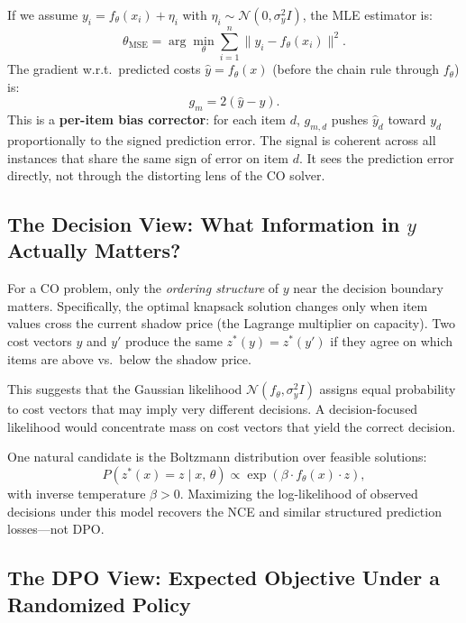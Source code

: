 \documentclass[11pt]{article}
\begin{document}
If we assume $y_i = f_\theta(x_i) + \eta_i$ with $\eta_i \sim \mathcal{N}(0,
\sigma_y^2 I)$, the MLE estimator is:
\begin{equation}
  \theta_{\mathrm{MSE}} = \arg\min_\theta \sum_{i=1}^n
    \|y_i - f_\theta(x_i)\|^2.
  \label{eq:mse}
\end{equation}
The gradient w.r.t.\ predicted costs $\hat{y} = f_\theta(x)$ (before the chain
rule through $f_\theta$) is:
\begin{equation}
  g_m = 2(\hat{y} - y).
  \label{eq:gm}
\end{equation}
This is a \textbf{per-item bias corrector}: for each item $d$, $g_{m,d}$ pushes
$\hat{y}_d$ toward $y_d$ proportionally to the signed prediction error.  The
signal is coherent across all instances that share the same sign of error on
item $d$.  It sees the prediction error directly, not through the distorting
lens of the CO solver.

\subsection{The Decision View: What Information in $y$ Actually Matters?}

For a CO problem, only the \emph{ordering structure} of $y$ near the decision
boundary matters.  Specifically, the optimal knapsack solution changes only when
item values cross the current shadow price (the Lagrange multiplier on capacity).
Two cost vectors $y$ and $y'$ produce the same $z^*(y) = z^*(y')$ if they agree
on which items are above vs.\ below the shadow price.

This suggests that the Gaussian likelihood $\mathcal{N}(f_\theta, \sigma_y^2 I)$
assigns equal probability to cost vectors that may imply very different decisions.
A decision-focused likelihood would concentrate mass on cost vectors that yield
the correct decision.

One natural candidate is the Boltzmann distribution over feasible solutions:
\begin{equation}
  P(z^*(x) = z \mid x,\, \theta) \propto \exp\!\left(\beta \cdot
    f_\theta(x) \cdot z\right),
  \label{eq:boltzmann}
\end{equation}
with inverse temperature $\beta > 0$.  Maximizing the log-likelihood of
observed decisions under this model recovers the NCE and similar structured
prediction losses---not DPO.

\subsection{The DPO View: Expected Objective Under a Randomized Policy}
\end{document}
